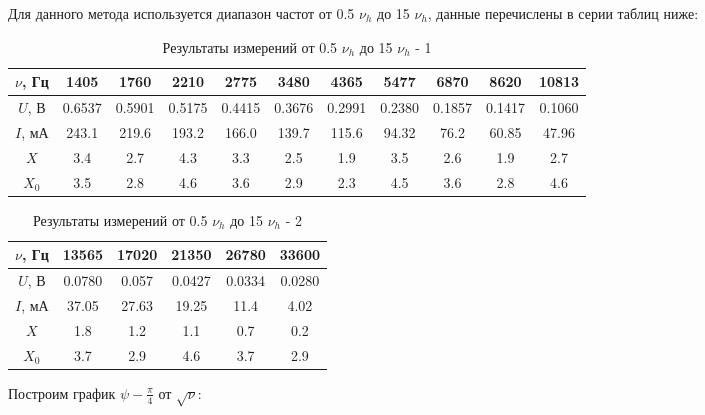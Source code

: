 \documentclass[a4paper,12pt]{article} %
\begin{document}
Для данного метода используется диапазон частот от 0.5 $\nu_h$ до 15 $\nu_h$, данные перечислены в серии таблиц ниже:

\begin{table}[H]
	\centering
	\begin{tabular}{|c|c|c|c|c|c|c|c|c|c|c|}
		\hline
		$ \nu $, Гц   & 1405   & 1760 & 2210 & 2775 & 3480 & 4365 & 5477 & 6870 & 8620 & 10813 \\ \hline
		$ U $, В & 0.6537 & 0.5901 & 0.5175 & 0.4415 & 0.3676 & 0.2991 & 0.2380 & 0.1857 & 0.1417 & 0.1060\\ \hline
		$ I $, мА & 243.1 & 219.6 & 193.2 & 166.0 & 139.7 & 115.6 & 94.32 & 76.2 & 60.85 & 47.96 \\ \hline
		$ X $  & 3.4 & 2.7 & 4.3 & 3.3 & 2.5 & 1.9 & 3.5 & 2.6 & 1.9 & 2.7 \\ \hline
		$ X_0 $  & 3.5 & 2.8 & 4.6 & 3.6 & 2.9 & 2.3 & 4.5 & 3.6 & 2.8 & 4.6 \\ \hline
	\end{tabular}
	\caption{Результаты измерений от 0.5 $\nu_h$ до 15 $\nu_h$  - 1}
	\label{tab:my-table1}
\end{table}

\begin{table}[H]
	\centering
	\begin{tabular}{|c|c|c|c|c|c|}
		\hline
		$ \nu $, Гц   & 13565   & 17020 & 21350 & 26780 & 33600 \\ \hline
		$ U $, В & 0.0780 & 0.057 & 0.0427 & 0.0334 & 0.0280\\ \hline
		$ I $, мА & 37.05 & 27.63 & 19.25 & 11.4 & 4.02 \\ \hline
		$ X $  & 1.8 & 1.2 & 1.1 & 0.7 & 0.2 \\ \hline
		$ X_0 $  & 3.7 & 2.9 & 4.6 & 3.7 & 2.9 \\ \hline
	\end{tabular}
	\caption{Результаты измерений от 0.5 $\nu_h$ до 15 $\nu_h$  - 2}
	\label{tab:my-table1}
\end{table}

Построим график $\psi - \frac{\pi}{4}$ от $\sqrt{\nu}$:
\end{document}
